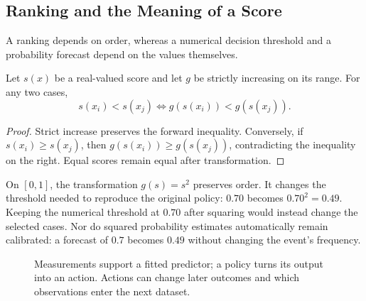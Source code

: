 \subsection{Ranking and the Meaning of a Score}

A ranking depends on order, whereas a numerical decision threshold and a probability forecast depend on the values themselves.

\begin{theorem}
Let $s(x)$ be a real-valued score and let $g$ be strictly increasing on its range. For any two cases,
\[
s(x_i)<s(x_j) \iff g(s(x_i))<g(s(x_j)).
\]
\end{theorem}

\begin{proof}
Strict increase preserves the forward inequality. Conversely, if $s(x_i)\geq s(x_j)$, then $g(s(x_i))\geq g(s(x_j))$, contradicting the inequality on the right. Equal scores remain equal after transformation.
\end{proof}

On $[0,1]$, the transformation $g(s)=s^2$ preserves order. It changes the threshold needed to reproduce the original policy: $0.70$ becomes $0.70^2=0.49$. Keeping the numerical threshold at $0.70$ after squaring would instead change the selected cases. Nor do squared probability estimates automatically remain calibrated: a forecast of $0.7$ becomes $0.49$ without changing the event's frequency.

\begin{figure}[t]
\centering
{}
\caption{Measurements support a fitted predictor; a policy turns its output into an action. Actions can change later outcomes and which observations enter the next dataset.}
\label{fig:world-to-decision}
\end{figure}

